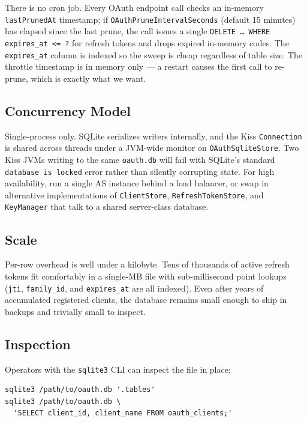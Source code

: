 There is no cron job.  Every OAuth endpoint call checks an in-memory \texttt{last\-Pruned\-At} timestamp; if \texttt{OAuth\-Prune\-Interval\-Seconds} (default 15 minutes) has elapsed since the last prune, the call issues a single \texttt{DELETE \dots\ WHERE expires\_at <= ?} for refresh tokens and drops expired in-memory codes.  The \texttt{expires\_at} column is indexed so the sweep is cheap regardless of table size.  The throttle timestamp is in memory only --- a restart causes the first call to re-prune, which is exactly what we want.

\subsection{Concurrency Model}

Single-process only.  SQLite serializes writers internally, and the Kiss \texttt{Connection} is shared across threads under a JVM-wide monitor on \texttt{OAuthSqliteStore}.  Two Kiss JVMs writing to the same \texttt{oauth.db} will fail with SQLite's standard \texttt{database is locked} error rather than silently corrupting state.  For high availability, run a single AS instance behind a load balancer, or swap in alternative implementations of \texttt{ClientStore}, \texttt{RefreshTokenStore}, and \texttt{KeyManager} that talk to a shared server-class database.

\subsection{Scale}

Per-row overhead is well under a kilobyte.  Tens of thousands of active refresh tokens fit comfortably in a single-MB file with sub-millisecond point lookups (\texttt{jti}, \texttt{family\_id}, and \texttt{expires\_at} are all indexed).  Even after years of accumulated registered clients, the database remains small enough to ship in backups and trivially small to inspect.

\subsection{Inspection}

Operators with the \texttt{sqlite3} CLI can inspect the file in place:

\begin{lstlisting}[style=shell]
sqlite3 /path/to/oauth.db '.tables'
sqlite3 /path/to/oauth.db \
  'SELECT client_id, client_name FROM oauth_clients;'
\end{lstlisting}

